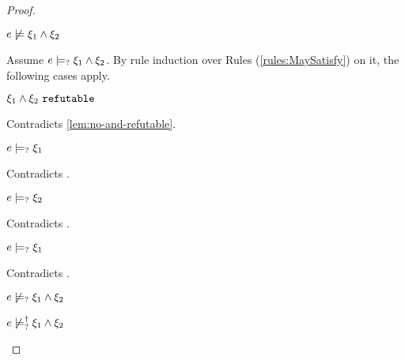 \begin{proof}
\begin{byCases}
\begin{byCases}
\begin{byCases}
        \end{byCases}
        \begin{pfsteps*}
        \item $e \not\models \xi_1 \wedge \xi_2$  
        \end{pfsteps*}
        Assume $e \models_{?} \xi_1 \wedge \xi_2$. By rule induction over Rules (\ref{rules:MaySatisfy}) on it, the following cases apply.
        \begin{byCases}
        \item[\text{(\ref{rule:CMSNotVal})}]
            \begin{pfsteps*}
            \item $\xi_1 \wedge \xi_2 ~\mathtt{refutable}$ 
            \end{pfsteps*}
            Contradicts \autoref{lem:no-and-refutable}.
        \item[\text{(\ref{rule:CMSAnd1})}]
            \begin{pfsteps*}
            \item $e \models_{?} \xi_1$ 
            \end{pfsteps*}
            Contradicts .
        \item[\text{(\ref{rule:CMSAnd2})}]
            \begin{pfsteps*}
            \item $e \models_{?} \xi_2$ 
            \end{pfsteps*}
            Contradicts .
        \item[\text{(\ref{rule:CMSAnd3})}]
            \begin{pfsteps*}
            \item $e \models_{?} \xi_1$ 
            \end{pfsteps*}
            Contradicts .
        \end{byCases}
        \begin{pfsteps*}
        \item $e \not\models_{?} \xi_1 \wedge \xi_2$  
        \item $e \not\models_{?}^{\dag} \xi_1 \wedge \xi_2$ 
        \end{pfsteps*}
    \end{byCases}
    

\end{byCases}
\end{proof}
